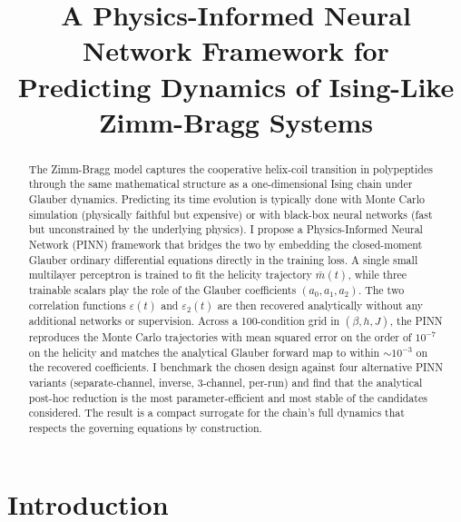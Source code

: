 \documentclass[conference]{IEEEtran}
\newcommand{\mbar}{\bar m(t)}
\newcommand{\eps}{\varepsilon}
\newcommand{\epstwo}{\varepsilon_2}
\begin{document}
\title{A Physics-Informed Neural Network Framework for\\
Predicting Dynamics of Ising-Like Zimm-Bragg Systems}

\author{
}

\maketitle

\begin{abstract}
The Zimm-Bragg model captures the cooperative helix-coil transition in
polypeptides through the same mathematical structure as a one-dimensional
Ising chain under Glauber dynamics. Predicting its time evolution is
typically done with Monte Carlo simulation (physically faithful but
expensive) or with black-box neural networks (fast but unconstrained by the
underlying physics). I propose a Physics-Informed Neural Network (PINN)
framework that bridges the two by embedding the closed-moment Glauber
ordinary differential equations directly in the training loss. A single
small multilayer perceptron is trained to fit the helicity trajectory
$\mbar$, while three trainable scalars play the role of the Glauber
coefficients $(a_0, a_1, a_2)$. The two correlation functions
$\eps(t)$ and $\epstwo(t)$ are then recovered analytically without any
additional networks or supervision. Across a 100-condition grid in
$(\beta, h, J)$, the PINN reproduces the Monte Carlo trajectories with mean
squared error on the order of $10^{-7}$ on the helicity and matches
the analytical Glauber forward map to within $\sim\!10^{-3}$ on the
recovered coefficients. I benchmark the chosen design against four
alternative PINN variants (separate-channel, inverse, 3-channel, per-run)
and find that the analytical post-hoc reduction is the most
parameter-efficient and most stable of the candidates considered. The
result is a compact surrogate for the chain's full dynamics that respects
the governing equations by construction.
\end{abstract}

\section{Introduction}
\label{sec:intro}
\end{document}
